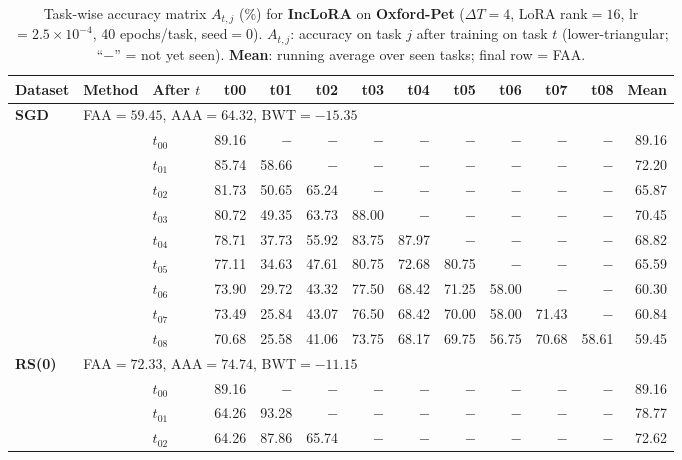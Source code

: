 \begin{table}[ht]
\centering
\caption{%
  Task-wise accuracy matrix $A_{t,j}$ (\%) for \textbf{IncLoRA} on \textbf{Oxford-Pet} ($\Delta T=4$, LoRA rank$=16$, lr$=2.5\times10^{-4}$, 40 epochs/task, seed$=0$).
  $A_{t,j}$: accuracy on task $j$ after training on task $t$  (lower-triangular; ``$-$'' = not yet seen).
  \textbf{Mean}: running average over seen tasks; final row = FAA.
}
\label{tab:raw_inclora_pets}
\setlength{\tabcolsep}{2.8pt}
\renewcommand{\arraystretch}{0.88}
\scriptsize
\begin{tabular}{@{}l l l *{10}{r}@{}}
\toprule
\textbf{Dataset} & \textbf{Method} & \textbf{After $t$} & \textbf{t00} & \textbf{t01} & \textbf{t02} & \textbf{t03} & \textbf{t04} & \textbf{t05} & \textbf{t06} & \textbf{t07} & \textbf{t08} & \textbf{Mean} \\
\midrule
\multirow{10}{*}{\textbf{SGD}} & \multicolumn{11}{l}{\quad\small FAA$=59.45$,\; AAA$=64.32$,\; BWT$=-15.35$} \\
 & & $t_{00}$ & 89.16 & $-$ & $-$ & $-$ & $-$ & $-$ & $-$ & $-$ & $-$ & 89.16 \\
 & & $t_{01}$ & 85.74 & 58.66 & $-$ & $-$ & $-$ & $-$ & $-$ & $-$ & $-$ & 72.20 \\
 & & $t_{02}$ & 81.73 & 50.65 & 65.24 & $-$ & $-$ & $-$ & $-$ & $-$ & $-$ & 65.87 \\
 & & $t_{03}$ & 80.72 & 49.35 & 63.73 & 88.00 & $-$ & $-$ & $-$ & $-$ & $-$ & 70.45 \\
 & & $t_{04}$ & 78.71 & 37.73 & 55.92 & 83.75 & 87.97 & $-$ & $-$ & $-$ & $-$ & 68.82 \\
 & & $t_{05}$ & 77.11 & 34.63 & 47.61 & 80.75 & 72.68 & 80.75 & $-$ & $-$ & $-$ & 65.59 \\
 & & $t_{06}$ & 73.90 & 29.72 & 43.32 & 77.50 & 68.42 & 71.25 & 58.00 & $-$ & $-$ & 60.30 \\
 & & $t_{07}$ & 73.49 & 25.84 & 43.07 & 76.50 & 68.42 & 70.00 & 58.00 & 71.43 & $-$ & 60.84 \\
 & & $t_{08}$ & 70.68 & 25.58 & 41.06 & 73.75 & 68.17 & 69.75 & 56.75 & 70.68 & 58.61 & 59.45 \\
\midrule
\multirow{10}{*}{\textbf{RS(0)}} & \multicolumn{11}{l}{\quad\small FAA$=72.33$,\; AAA$=74.74$,\; BWT$=-11.15$} \\
 & & $t_{00}$ & 89.16 & $-$ & $-$ & $-$ & $-$ & $-$ & $-$ & $-$ & $-$ & 89.16 \\
 & & $t_{01}$ & 64.26 & 93.28 & $-$ & $-$ & $-$ & $-$ & $-$ & $-$ & $-$ & 78.77 \\
 & & $t_{02}$ & 64.26 & 87.86 & 65.74 & $-$ & $-$ & $-$ & $-$ & $-$ & $-$ & 72.62 \\

\end{tabular}
\end{table}
